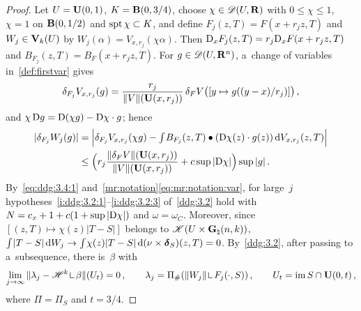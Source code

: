 \documentclass[a4paper,twoside,leqno]{article}
\newcommand{\Gk}{\pgrass{\adim}{\vdim}}        %
\begin{document}
\begin{proof}
    Let $U = \mathbf{U}(0,1)$, $K = \mathbf{B}(0,3/4)$, choose $\chi \in \mathscr{D}(U,\mathbf{R})$ with $0 \le \chi
    \le 1$, $\chi = 1$ on $\mathbf{B}(0,1/2)$ and $\operatorname{spt} \chi \subset K$, and define $F_j(z,T) = F(x +
    r_j z, T)$ and $W_j \in \mathbf{V}_{k}(U)$ by $W_j(\alpha) = V_{x,r_j}(\chi \alpha)$. Then
    $\mathrm{D}_x F_j(z,T) = r_j \mathrm{D}_x F(x + r_j z, T)$ and $B_{F_j}(z,T) = B_F(x + r_j z, T)$. For $g \in
    \mathscr{D}(U,\mathbf{R}^{n})$, a~change of variables in~\ref{def:firstvar} gives
    \begin{displaymath}
        \delta_{F_j} V_{x,r_j}(g) = \frac{r_j}{\|V\|(\mathbf{U}(x,r_j))} \, \delta_F V \bigl( [ y
        \mapsto g((y - x)/r_j) ] \bigr) \,,
    \end{displaymath}
    and $\chi \, \mathrm{D} g = \mathrm{D}(\chi g) - \mathrm{D} \chi \cdot g$; hence
    \begin{displaymath}
        \begin{aligned}
            |\delta_{F_j} W_j(g)| & = \Bigl| \delta_{F_j} V_{x,r_j}(\chi g) - {\textstyle\int_{}^{}} B_{F_j}(z,T)
            \bullet (\mathrm{D} \chi(z) \cdot g(z)) \,\mathrm{d} V_{x,r_j}(z,T) \Bigr| \\
            & \le \Bigl( r_j \frac{\|\delta_F V\|(\mathbf{U}(x,r_j))}{\|V\|(\mathbf{U}(x,r_j))} + c \sup
            |\mathrm{D} \chi| \Bigr) \sup |g| \,.
        \end{aligned}
    \end{displaymath}
    By~\eqref{eq:ddg:3.4:1} and~\ref{mr:notation}\eqref{eq:mr:notation:var}, for large~$j$
    hypotheses~\ref{i:ddg:3.2:1}--\ref{i:ddg:3.2:3} of~\ref{ddg:3.2} hold with $N = c_x + 1 + c
    (1 + \sup |\mathrm{D} \chi|)$ and $\omega = \omega_C$. Moreover, since $[ (z,T) \mapsto \chi(z) |T - S|
    ]$ belongs to $\ccspace{U \times \Gk}$, ${\textstyle\int_{}^{}} |T - S| \,\mathrm{d} W_j \to {\textstyle\int_{}^{}}
    \chi(z) |T - S| \,\mathrm{d} (\nu \times \boldsymbol{\delta}_{S})(z,T) = 0$. By~\ref{ddg:3.2}, after passing to
    a~subsequence, there is~$\beta$ with
    \begin{equation}
        \label{eq:ddg:3.4:2}
        \lim_{j \to \infty} \|\lambda_j - \HM^{\vdim} \restrict \beta\|(U_t) = 0 \,, \qquad
        \lambda_j = \Pi_\# (\|W_j\| \restrict F_j(\cdot,S)) \,, \qquad U_t = \im S \cap
        \oball{0}{t} \,,
    \end{equation}
    where $\Pi = \Pi_S$ and $t = 3/4$.


\end{proof}
\end{document}
